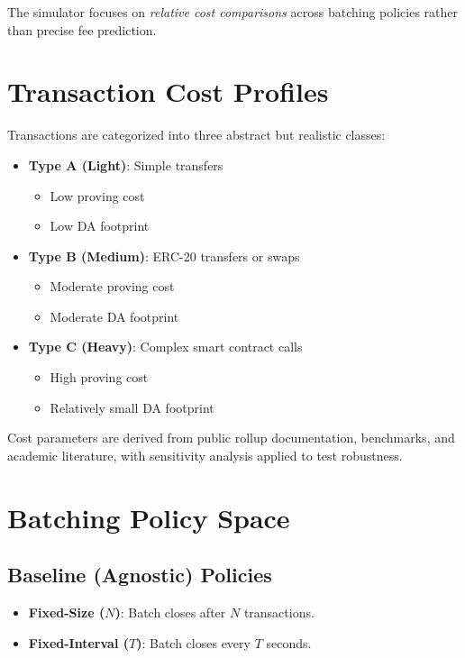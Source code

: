\documentclass[11pt]{article}
\begin{document}
The simulator focuses on \emph{relative cost comparisons} across batching policies rather than precise fee prediction.

\section{Transaction Cost Profiles}

Transactions are categorized into three abstract but realistic classes:

\begin{itemize}[leftmargin=1.5em]
    \item \textbf{Type A (Light)}: Simple transfers
    \begin{itemize}
        \item Low proving cost
        \item Low DA footprint
    \end{itemize}

    \item \textbf{Type B (Medium)}: ERC-20 transfers or swaps
    \begin{itemize}
        \item Moderate proving cost
        \item Moderate DA footprint
    \end{itemize}

    \item \textbf{Type C (Heavy)}: Complex smart contract calls
    \begin{itemize}
        \item High proving cost
        \item Relatively small DA footprint
    \end{itemize}
\end{itemize}

Cost parameters are derived from public rollup documentation, benchmarks, and academic literature, with sensitivity analysis applied to test robustness.

\section{Batching Policy Space}

\subsection{Baseline (Agnostic) Policies}

\begin{itemize}[leftmargin=1.5em]
    \item \textbf{Fixed-Size ($N$)}: Batch closes after $N$ transactions.
    \item \textbf{Fixed-Interval ($T$)}: Batch closes every $T$ seconds.
\end{itemize}
\end{document}
